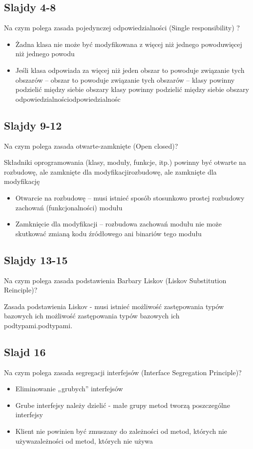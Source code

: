 \documentclass[a4paper,15pt]{article}
\begin{document}
\subsection{Slajdy 4-8}
\begin{framed}
Na czym polega zasada pojedynczej odpowiedzialności (Single responsibility) ?
\end{framed}
\begin{itemize}
\item Żadna klasa nie może być modyfikowana z więcej niż jednego powoduwięcej niż jednego powodu
\item Jeśli klasa odpowiada za więcej niż jeden obszar to powoduje związanie tych obszarów – obszar to powoduje związanie tych obszarów – klasy powinny podzielić między siebie obszary klasy powinny podzielić między siebie obszary odpowiedzialnościodpowiedzialnośc
\end{itemize}

\subsection{Slajdy 9-12}
\begin{framed}
Na czym polega zasada otwarte-zamknięte (Open closed)?
\end{framed}
Składniki oprogramowania (klasy, moduły, funkcje, itp.) powinny być otwarte na rozbudowę, ale zamknięte dla modyfikacjirozbudowę, ale zamknięte dla modyfikację
\begin{itemize}
\item Otwarcie na rozbudowę – musi istnieć sposób stosunkowo prostej rozbudowy zachowań (funkcjonalności) modułu
\item Zamknięcie dla modyfikacji – rozbudowa zachowań modułu nie może skutkować zmianą kodu źródłowego ani binariów tego modułu
\end{itemize}


\subsection{Slajdy 13-15}
\begin{framed}
Na czym polega zasada podstawienia Barbary Liskov (Liskov Substitution Reinciple)?
\end{framed}
Zasada podstawienia Liskov - musi istnieć możliwość zastępowania typów bazowych ich możliwość zastępowania typów bazowych ich podtypami.podtypami.

\subsection{Slajd 16}
\begin{framed}
Na czym polega zasada segregacji interfejsów (Interface Segregation Principle)?
\end{framed}
\begin{itemize}
\item Eliminowanie „grubych” interfejsów
\item Grube interfejsy należy dzielić - małe grupy metod tworzą poszczególne interfejsy
\item Klient nie powinien być zmuszany do zależności od metod, których nie używazależności od metod, których nie używa
\end{itemize}
\end{document}
